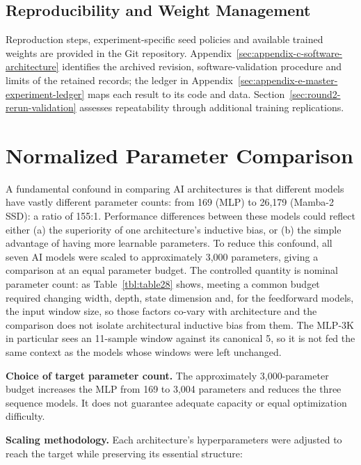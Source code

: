 \subsection{Reproducibility and Weight Management}\label{sec:reproducibility-and-weight-management}

Reproduction steps, experiment-specific seed policies and available trained weights are provided in the Git repository. Appendix~\ref{sec:appendix-c-software-architecture} identifies the archived revision, software-validation procedure and limits of the retained records; the ledger in Appendix~\ref{sec:appendix-e-master-experiment-ledger} maps each result to its code and data. Section~\ref{sec:round2-rerun-validation} assesses repeatability through additional training replications.

\section{Normalized Parameter Comparison}\label{sec:normalized-parameter-comparison}

A fundamental confound in comparing AI architectures is that different models have vastly different parameter counts: from 169 (MLP) to 26,179 (Mamba-2 SSD): a ratio of 155:1. Performance differences between these models could reflect either (a) the superiority of one architecture's inductive bias, or (b) the simple advantage of having more learnable parameters. To reduce this confound, all seven AI models were scaled to approximately 3,000 parameters, giving a comparison at an equal parameter budget. The controlled quantity is nominal parameter count: as Table~\ref{tbl:table28} shows, meeting a common budget required changing width, depth, state dimension and, for the feedforward models, the input window size, so those factors co-vary with architecture and the comparison does not isolate architectural inductive bias from them. The MLP-3K in particular sees an 11-sample window against its canonical 5, so it is not fed the same context as the models whose windows were left unchanged.

\textbf{Choice of target parameter count.} The approximately 3,000-parameter budget increases the MLP from 169 to 3,004 parameters and reduces the three sequence models. It does not guarantee adequate capacity or equal optimization difficulty.

\textbf{Scaling methodology.} Each architecture's hyperparameters were adjusted to reach the target while preserving its essential structure:

